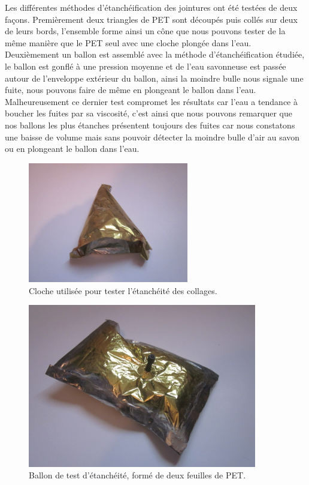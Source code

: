 \documentclass[a4paper,11pt]{article}
\begin{document}
Les différentes méthodes d'étanchéification des jointures ont été testées de deux façons.
Premièrement deux triangles de PET sont découpés puis collés sur deux de leurs bords, l'ensemble forme ainsi un cône que nous pouvons tester de la même manière que le PET seul avec une cloche plongée dans l'eau.
Deuxièmement un ballon est assemblé avec la méthode d'étanchéification étudiée, le ballon est gonflé à une pression moyenne et de l'eau savonneuse est passée autour de l'enveloppe extérieur du ballon, ainsi la moindre bulle nous signale une fuite, nous pouvons faire de même en plongeant le ballon dans l'eau. Malheureusement ce dernier test compromet les résultats car l'eau a tendance à boucher les fuites par sa viscosité, c'est ainsi que nous pouvons remarquer que nos ballons les plus étanches présentent toujours des fuites car nous constatons une baisse de volume mais sans pouvoir détecter la moindre bulle d'air au savon ou en plongeant le ballon dans l'eau.


\begin{figure}[H]
 \centering
 \includegraphics[width=7cm]{../Images/cloche_colle.JPG}
 \caption{Cloche utilisée pour tester l'étanchéité des collages.}
\end{figure}

\begin{figure}[H]
 \centering
 \includegraphics[width=10cm]{../Images/ballon_etanche.JPG}
 \caption{Ballon de test d'étanchéité, formé de deux feuilles de PET.}
\end{figure}
\end{document}
